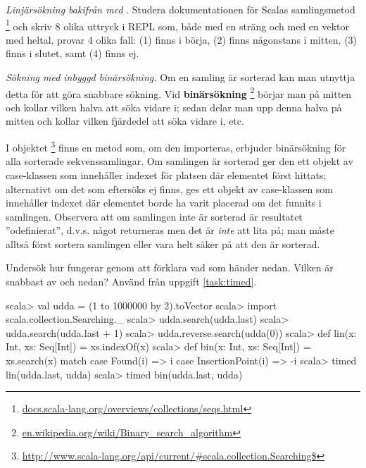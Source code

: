 \Subtask \emph{Linjärsökning bakifrån med }. Studera dokumentationen för Scalas samlingsmetod \footnote{\href{http://docs.scala-lang.org/overviews/collections/seqs.html}{docs.scala-lang.org/overviews/collections/seqs.html}} och skriv 8 olika uttryck i REPL som, både med en sträng och med en vektor med heltal, provar 4 olika fall: (1) finns i börja, (2) finns någonstans i mitten, (3) finns i slutet, samt (4) finns ej.

\Subtask \emph{Sökning med inbyggd binärsökning.} Om en samling är sorterad kan man utnyttja detta för att göra snabbare sökning. Vid \textbf{binärsökning} \footnote{\href{https://en.wikipedia.org/wiki/Binary_search_algorithm}{en.wikipedia.org/wiki/Binary\_search\_algorithm}} börjar man på mitten och kollar vilken halva att  söka vidare i; sedan delar man upp denna halva på mitten och kollar vilken fjärdedel att söka vidare i, etc. 

I objektet \footnote{\href{http://www.scala-lang.org/api/current/\#scala.collection.Searching$}{http://www.scala-lang.org/api/current/\#scala.collection.Searching\$}} finns en metod  som, om den importeras, erbjuder binärsökning för alla sorterade sekvenssamlingar. Om samlingen är sorterad ger den ett objekt av case-klassen  som innehåller indexet för platsen där elementet först hittats; alternativt om det som eftersöks ej finns, ges ett objekt av case-klassen  som innehåller indexet där elementet borde ha varit placerad om det funnits i samlingen. Observera att om samlingen inte är sorterad är resultatet ''odefinierat'', d.v.s. något returneras men det är \emph{inte} att lita på; man måste alltså först sortera samlingen eller vara helt säker på att den är sorterad. 

Undersök hur  fungerar genom att förklara vad som händer nedan. Vilken är snabbast av  och  nedan? Använd  från uppgift \ref{task:timed}.

\begin{REPL}
scala> val udda = (1 to 1000000 by 2).toVector
scala> import scala.collection.Searching._
scala> udda.search(udda.last)
scala> udda.search(udda.last + 1)
scala> udda.reverse.search(udda(0))  
scala> def lin(x: Int, xs: Seq[Int]) = xs.indexOf(x)
scala> def bin(x: Int, xs: Seq[Int]) = xs.search(x) match {
         case Found(i) => i
         case InsertionPoint(i) => -i
       }
scala> timed{ lin(udda.last, udda) }
scala> timed{ bin(udda.last, udda) }
\end{REPL}

